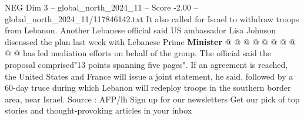 \begin{textsample}{NEG Dim 3 – global\_north\_2024\_11 – Score -2.00 – global\_north\_2024\_11/117846142.txt}
It also called for Israel to withdraw troops from Lebanon.
Another Lebanese official said US ambassador Lisa Johnson discussed the plan last week with Lebanese Prime \textbf{Minister} @ @ @ @ @ @ @ @ @ @ has led mediation efforts on behalf of the group.
The official said the proposal comprised"13 points spanning five pages".
If an agreement is reached, the United States and France will issue a joint statement, he said, followed by a 60-day truce during which Lebanon will redeploy troops in the southern border area, near Israel.
Source : AFP/lh Sign up for our newsletters Get our pick of top stories and thought-provoking articles in your inbox

\end{textsample}

